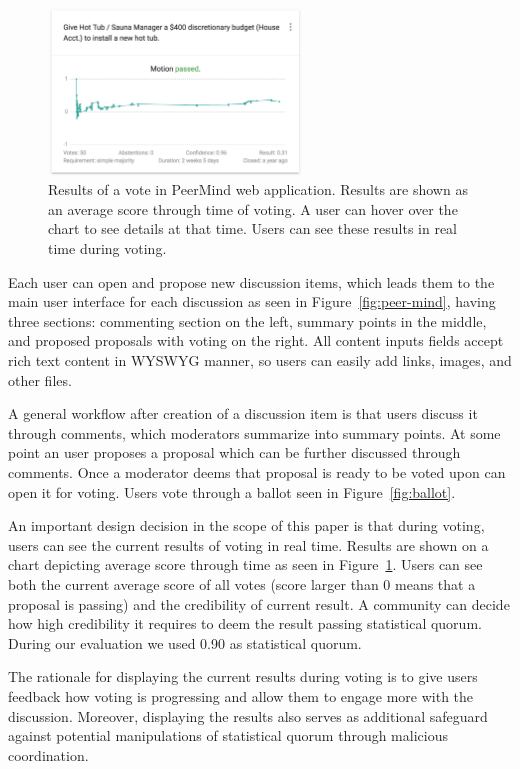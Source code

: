 \documentclass[format=acmsmall, review=true, screen=true, anonymous=true]{acmart}
\begin{document}
\begin{figure}[ht]
\centering
\includegraphics[width=0.6\textwidth]{figures/results.png}
\caption{Results of a vote in PeerMind web application. Results are shown as an average score through time of voting.
A user can hover over the chart to see details at that time. Users can see these results in real time during voting.}
\label{fig:results}
\end{figure}

Each user can open and propose new discussion items, which leads them to the main user interface for each discussion as seen in Figure~\ref{fig:peer-mind}, having three sections: commenting section on the left, summary points in the middle,
and proposed proposals with voting on the right. All content inputs fields accept rich text content in WYSWYG manner,
so users can easily add links, images, and other files.

A general workflow after creation of a discussion item is that users discuss it through comments,
which moderators summarize into summary points. At some point an user proposes a proposal which can be
further discussed through comments. Once a moderator deems that proposal is ready to be voted upon
can open it for voting. Users vote through a ballot seen in Figure~\ref{fig:ballot}.

An important design decision in the scope of this paper is that during voting, users can see the current
results of voting in real time. Results are shown on a chart depicting average score through time
as seen in Figure~\ref{fig:results}. Users can see both the current average score of all votes (score
larger than 0 means that a proposal is passing) and the credibility of current result. A community can decide
how high credibility it requires to deem the result passing statistical quorum. During our evaluation
we used 0.90 as statistical quorum.

The rationale for displaying the current results during voting is to give users feedback how voting
is progressing and allow them to engage more with the discussion. Moreover, displaying the results
also serves as additional safeguard against potential manipulations of statistical quorum through malicious
coordination.
\end{document}
